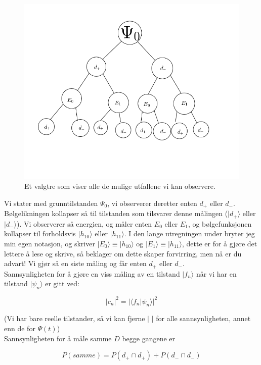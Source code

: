 \documentclass[a4paper,norsk, 10pt]{article}
\numberwithin{equation}{section}
\begin{document}
\begin{figure}[H]
\centering
\includegraphics[scale=0.6]{3c.png}
\caption{Et valgtre som viser alle de mulige utfallene vi kan observere.}
\end{figure}

Vi stater med grunntilstanden $\Psi_0$, vi observerer deretter enten $d_+$ eller $d_-$. Bølgelikningen kollapser så til tilstanden som tilsvarer denne målingen ($|d_+\rangle$ eller $|d_-\rangle$). Vi observerer så energien, og måler enten $E_0$ eller $E_1$, og bølgefunksjonen kollapser til forholdsvis $|h_{10}\rangle$ eller $|h_{11}\rangle$. I den lange utregningen under bryter jeg min egen notasjon, og skriver $|E_0\rangle \equiv |h_{10}\rangle $ og $|E_1\rangle \equiv |h_{11}\rangle $, dette er for å gjøre det lettere å lese og skrive, så beklager om dette skaper forvirring, men nå er du advart! Vi gjør så en siste måling og får enten $d_+$ eller $d_-$.\\

Sannsynligheten for å gjøre en viss måling av en tilstand $| f_n\rangle$ når vi har en tilstand $|\psi_n\rangle$ er gitt ved:

$$
|c_n|^2 = |\langle f_n|\psi_n\rangle|^2
$$

(Vi har bare reelle tilstander, så vi kan fjerne $|$ $|$ for alle sannsynligheten, annet enn de for $\Psi(t)$)\\

Sannsynligheten for å måle samme $D$ begge gangene er

\begin{equation}
P(samme) = P(d_+ \cap d_+) + P(d_- \cap d_-)
\label{eq:Psamme}
\end{equation}
\end{document}

